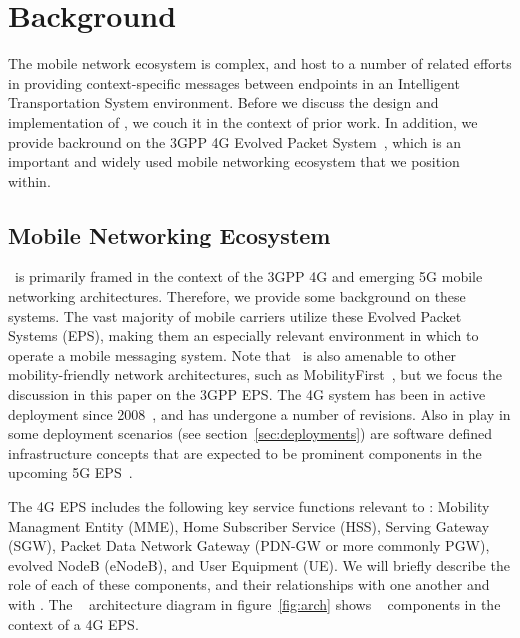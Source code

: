 \section{Background}

The mobile network ecosystem is complex, and host to a number of
related efforts in providing context-specific messages between
endpoints in an Intelligent Transportation System environment. Before
we discuss the design and implementation of \name, we couch it in
the context of prior work. In addition, we provide backround on the
3GPP 4G Evolved Packet System~\cite{4G}, which is an important and
widely used mobile networking ecosystem that we position \name~
within.

%
%


\subsection{Mobile Networking Ecosystem}

\name~is primarily framed in the context of the 3GPP 4G and emerging
5G mobile networking architectures. Therefore, we provide some
background on these systems.  The vast majority of mobile carriers
utilize these Evolved Packet Systems (EPS), making them an especially
relevant environment in which to operate a mobile messaging system.
Note that \name~is also amenable to other mobility-friendly network
architectures, such as MobilityFirst~\cite{raychaudhuri2012mobilityfirst}, 
but we
focus the discussion in this paper on the 3GPP EPS.  The 4G system has
been in active deployment since 2008~\cite{chen2015financial}, and has
undergone a number of revisions. Also in play in some deployment
scenarios (see section~\ref{sec:deployments}) are software defined
infrastructure concepts that are expected to be prominent components
in the upcoming 5G EPS~\cite{5gvision}.

The 4G EPS includes the following key service functions relevant to
\name: Mobility Managment Entity (MME), Home Subscriber Service
(HSS), Serving Gateway (SGW), Packet Data Network Gateway (PDN-GW or
more commonly PGW), evolved NodeB (eNodeB), and User Equipment (UE).
We will briefly describe the role of each of these components, and
their relationships with one another and with \name. The \name~
architecture diagram in figure~\ref{fig:arch} shows \name~
components in the context of a 4G EPS.

